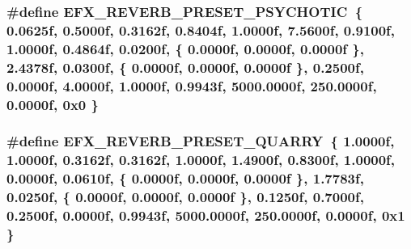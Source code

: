 \subsubsection[{\texorpdfstring{E\+F\+X\+\_\+\+R\+E\+V\+E\+R\+B\+\_\+\+P\+R\+E\+S\+E\+T\+\_\+\+P\+S\+Y\+C\+H\+O\+T\+IC}{EFX_REVERB_PRESET_PSYCHOTIC}}]{\setlength{\rightskip}{0pt plus 5cm}\#define E\+F\+X\+\_\+\+R\+E\+V\+E\+R\+B\+\_\+\+P\+R\+E\+S\+E\+T\+\_\+\+P\+S\+Y\+C\+H\+O\+T\+IC~\{ 0.\+0625f, 0.\+5000f, 0.\+3162f, 0.\+8404f, 1.\+0000f, 7.\+5600f, 0.\+9100f, 1.\+0000f, 0.\+4864f, 0.\+0200f, \{ 0.\+0000f, 0.\+0000f, 0.\+0000f \}, 2.\+4378f, 0.\+0300f, \{ 0.\+0000f, 0.\+0000f, 0.\+0000f \}, 0.\+2500f, 0.\+0000f, 4.\+0000f, 1.\+0000f, 0.\+9943f, 5000.\+0000f, 250.\+0000f, 0.\+0000f, 0x0 \}}\hypertarget{efx-presets_8h_ad8163f43e1716894be621dcd79d54d2c}{}\label{efx-presets_8h_ad8163f43e1716894be621dcd79d54d2c}
\subsubsection[{\texorpdfstring{E\+F\+X\+\_\+\+R\+E\+V\+E\+R\+B\+\_\+\+P\+R\+E\+S\+E\+T\+\_\+\+Q\+U\+A\+R\+RY}{EFX_REVERB_PRESET_QUARRY}}]{\setlength{\rightskip}{0pt plus 5cm}\#define E\+F\+X\+\_\+\+R\+E\+V\+E\+R\+B\+\_\+\+P\+R\+E\+S\+E\+T\+\_\+\+Q\+U\+A\+R\+RY~\{ 1.\+0000f, 1.\+0000f, 0.\+3162f, 0.\+3162f, 1.\+0000f, 1.\+4900f, 0.\+8300f, 1.\+0000f, 0.\+0000f, 0.\+0610f, \{ 0.\+0000f, 0.\+0000f, 0.\+0000f \}, 1.\+7783f, 0.\+0250f, \{ 0.\+0000f, 0.\+0000f, 0.\+0000f \}, 0.\+1250f, 0.\+7000f, 0.\+2500f, 0.\+0000f, 0.\+9943f, 5000.\+0000f, 250.\+0000f, 0.\+0000f, 0x1 \}}\hypertarget{efx-presets_8h_a75ff37a6a3dba17f608feecd3e3b7a3f}{}\label{efx-presets_8h_a75ff37a6a3dba17f608feecd3e3b7a3f}
